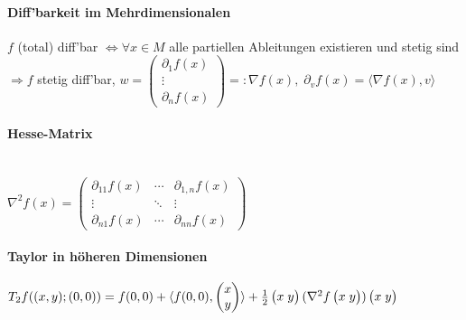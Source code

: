 \documentclass[paper=a3,paper=landscape, fontsize=9pt, DIV=30]{scrartcl}
\begin{document}
\begin{multicols*}{4}
 \paragraph{Diff'barkeit im Mehrdimensionalen}
 $f$ (total) diff'bar $\Leftrightarrow \forall x \in M$ alle partiellen Ableitungen existieren und stetig sind $\Rightarrow f$ stetig diff'bar, $w=\begin{pmatrix}
 \partial_1f(x)\\\vdots \\ \partial_nf(x)
 \end{pmatrix} =: \nabla f(x),\; \partial_vf(x)=\langle \nabla f(x), v \rangle$

 \paragraph{Hesse-Matrix}\hspace{0pt}\\
  $ \nabla^2f(x) = \begin{pmatrix}
  \partial_{11}f(x)  & \cdots & \partial_{1,n}f(x) \\
  \vdots  & \ddots & \vdots  \\
  \partial_{n1}f(x) & \cdots & \partial_{nn}f(x)
 \end{pmatrix}$

 \paragraph{Taylor in höheren Dimensionen}


 $\arraycolsep=1.4pt\def\arraystretch{1}
 T_2f((x,y);(0,0))=f(0,0)+\langle f(0,0),
 \begin{pmatrix}
   x\\
   y
 \end{pmatrix}
 \rangle + \frac{1}{2}
 \begin{pmatrix}
   x&y
 \end{pmatrix}
 (\nabla^2f
 \begin{pmatrix}
   x&y
 \end{pmatrix}
 )
 \begin{pmatrix}
   x&y
 \end{pmatrix}
 $


\end{multicols*}
\end{document}

